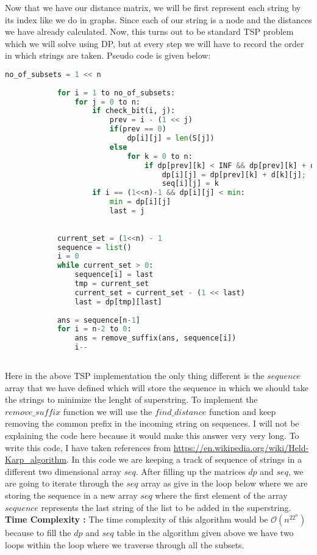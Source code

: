 \documentclass[14pt]{article}
\begin{document}
		\newline
		Now that we have our distance matrix, we will be first represent each string by its index like we do in graphs. Since each of our string is a node and the distances we have already calculated. Now, this turns out to be standard TSP problem which we will solve using DP, but at every step we will have to record the order in which strings are taken. Pseudo code is given below:
		\newpage
		\begin{lstlisting}[language=Python]
			no_of_subsets = 1 << n
			
			for i = 1 to no_of_subsets:
				for j = 0 to n:
					if check_bit(i, j):
						prev = i - (1 << j)
						if(prev == 0)
							dp[i][j] = len(S[j])
						else
							for k = 0 to n:
								if dp[prev][k] < INF && dp[prev][k] + d[k][j] < dp[i][j]:
									dp[i][j] = dp[prev][k] + d[k][j];
									seq[i][j] = k
					if i == (1<<n)-1 && dp[i][j] < min:
						min = dp[i][j]
						last = j
			
			
			current_set = (1<<n) - 1
			sequence = list()
			i = 0
			while current_set > 0:
				sequence[i] = last
				tmp = current_set
				current_set = current_set - (1 << last)
				last = dp[tmp][last]
			
			ans = sequence[n-1]
			for i = n-2 to 0:
				ans = remove_suffix(ans, sequence[i])
				i--
			
		\end{lstlisting}
		Here in the above TSP implementation the only thing different is the $sequence$ array that we have defined which will store the sequence in which we should take the strings to minimize the lenght of superstring. To implement the $remove\_suffix$ function we will use the $find\_distance$ function and keep removing the common prefix in the incoming string on sequences.
		I will not be explaining the code here because it would make this answer very very long. To write this code, I have taken references from \url{https://en.wikipedia.org/wiki/Held-Karp_algorithm}. In this code we are keeping a track of sequence of strings in a different two dimensional array $seq$. After filling up the matrices $dp$ and $seq$, we are going to iterate through the $seq$ array as give in the loop below where we are storing the sequence in a new array $seq$ where the first element of the array $sequence$ represents the last string of the list to be added in the superstring.\\
		\newline
		\textbf{Time Complexity : }The time complexity of this algorithm would be $\mathcal{O}(n^22^n)$ because to fill the $dp$ and $seq$ table in the algorithm given above we have two loops within the loop where we traverse through all the subsets. 
		
\end{document}
